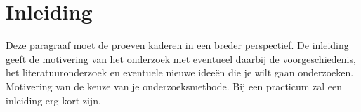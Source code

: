 \section{Inleiding}
Deze paragraaf moet de proeven kaderen in een breder perspectief. 
De inleiding geeft de motivering van het onderzoek met eventueel daarbij de voorgeschiedenis, het literatuuronderzoek en eventuele nieuwe ideeën die je wilt gaan onderzoeken. 
Motivering van de keuze van je onderzoeksmethode. 
Bij een practicum zal een inleiding erg kort zijn.